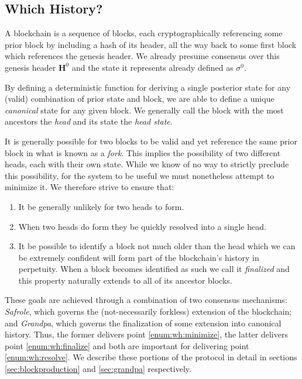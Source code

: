 \subsection{Which History?}

A blockchain is a sequence of blocks, each cryptographically referencing some prior block by including a hash of its header, all the way back to some first block which references the genesis header. We already presume consensus over this genesis header $\mathbf{H}^0$ and the state it represents already defined as $\sigma^0$.

By defining a deterministic function for deriving a single posterior state for any (valid) combination of prior state and block, we are able to define a unique \emph{canonical} state for any given block. We generally call the block with the most ancestors the \emph{head} and its state the \emph{head state}.

It is generally possible for two blocks to be valid and yet reference the same prior block in what is known as a \emph{fork}. This implies the possibility of two different heads, each with their own state. While we know of no way to strictly preclude this possibility, for the system to be useful we must nonetheless attempt to minimize it. We therefore strive to ensure that:

\begin{enumerate}
  \item\label{enum:wh:minimize} It be generally unlikely for two heads to form.
  \item\label{enum:wh:resolve} When two heads do form they be quickly resolved into a single head.
  \item\label{enum:wh:finalize} It be possible to identify a block not much older than the head which we can be extremely confident will form part of the blockchain's history in perpetuity. When a block becomes identified as such we call it \emph{finalized} and this property naturally extends to all of its ancestor blocks.
\end{enumerate}

These goals are achieved through a combination of two consensus mechanisms: \emph{Safrole}, which governs the (not-necessarily forkless) extension of the blockchain; and \emph{Grandpa}, which governs the finalization of some extension into canonical history. Thus, the former delivers point \ref{enum:wh:minimize}, the latter delivers point \ref{enum:wh:finalize} and both are important for delivering point \ref{enum:wh:resolve}. We describe these portions of the protocol in detail in sections \ref{sec:blockproduction} and \ref{sec:grandpa} respectively.

